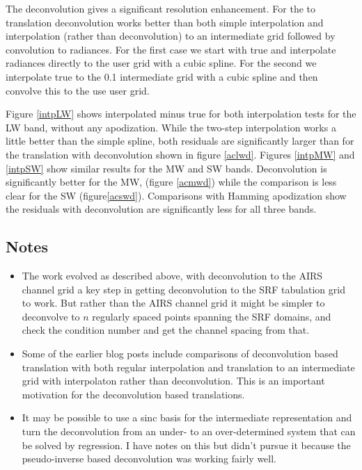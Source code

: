 \documentclass[12pt]{article}
\begin{document}
The {\airs} deconvolution gives a significant resolution
enhancement.  For the {\airs} to {\cris} translation deconvolution
works better than both simple interpolation and interpolation
(rather than deconvolution) to an intermediate grid followed by
convolution to {\cris} radiances.  For the first case we start with
true {\airs} and interpolate radiances directly to the {\cris} user
grid with a cubic spline.  For the second we interpolate true
{\airs} to the 0.1 {\wn} intermediate grid with a cubic spline and
then convolve this to the use {\cris} user grid.

Figure \ref{intpLW} shows interpolated {\cris} minus true {\cris}
for both interpolation tests for the LW band, without any
apodization.  While the two-step interpolation works a little better
than the simple spline, both residuals are significantly larger than
for the translation with deconvolution shown in figure \ref{aclwd}.
Figures \ref{intpMW} and \ref{intpSW} show similar results for the
MW and SW bands.  Deconvolution is significantly better for the MW,
(figure \ref{acmwd}) while the comparison is less clear for the SW
(figure\ref{acswd}).  Comparisons with Hamming apodization show the
residuals with deconvolution are significantly less for all three
bands.

\FloatBarrier

\subsection{Notes}

\begin{itemize}
  
  \item The work evolved as described above, with deconvolution to
    the AIRS channel grid a key step in getting deconvolution to the
    SRF tabulation grid to work.  But rather than the AIRS channel
    grid it might be simpler to deconvolve to $n$ regularly spaced
    points spanning the SRF domains, and check the condition number
    and get the channel spacing from that.

  \item Some of the earlier blog posts include comparisons of
    deconvolution based translation with both regular interpolation
    and translation to an intermediate grid with interpolaton rather
    than deconvolution.  This is an important motivation for the
    deconvolution based translations.

  \item It may be possible to use a sinc basis for the intermediate
    representation and turn the deconvolution from an under- to an
    over-determined system that can be solved by regression.  I have
    notes on this but didn't pursue it because the pseudo-inverse
    based deconvolution was working fairly well.

\end{itemize}
\end{document}
